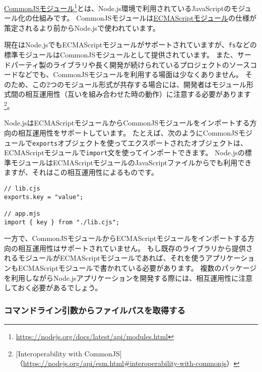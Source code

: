 \begin{tcolorbox}[enhanced jigsaw,breakable,title=CommonJSモジュール]\label{commonjs-module}

\href{https://nodejs.org/docs/latest/api/modules.html}{CommonJSモジュール}\footnote{\url{https://nodejs.org/docs/latest/api/modules.html}}とは、Node.js環境で利用されているJavaScriptのモジュール化の仕組みです。
CommonJSモジュールは\hyperlink{module}{ECMAScriptモジュール}の仕様が策定されるより前からNode.jsで使われています。

現在はNode.jsでもECMAScriptモジュールがサポートされていますが、\texttt{fs}などの標準モジュールはCommonJSモジュールとして提供されています。
また、サードパーティ製のライブラリや長く開発が続けられているプロジェクトのソースコードなどでも、CommonJSモジュールを利用する場面は少なくありません。
そのため、この2つのモジュール形式が共存する場合には、開発者はモジュール形式間の相互運用性（互いを組み合わせた時の動作）に注意する必要があります\footnote{[Interoperability with CommonJS]（\url{https://nodejs.org/api/esm.html\#interoperability-with-commonjs}）}。

Node.jsはECMAScriptモジュールからCommonJSモジュールをインポートする方向の相互運用性をサポートしています。
たとえば、次のようにCommonJSモジュールで\texttt{exports}オブジェクトを使ってエクスポートされたオブジェクトは、ECMAScriptモジュールで\texttt{import}文を使ってインポートできます。
Node.jsの標準モジュールはECMAScriptモジュールのJavaScriptファイルからでも利用できますが、それはこの相互運用性によるものです。

\begin{lstlisting}
// lib.cjs
exports.key = "value";

// app.mjs
import { key } from "./lib.cjs";
\end{lstlisting}

一方で、CommonJSモジュールからECMAScriptモジュールをインポートする方向の相互運用性はサポートされていません。
もし既存のライブラリから提供されるモジュールがECMAScriptモジュールであれば、それを使うアプリケーションもECMAScriptモジュールで書かれている必要があります。
複数のパッケージを利用しながらNode.jsアプリケーションを開発する際には、相互運用性に注意しておく必要があるでしょう。
\end{tcolorbox}

\hypertarget{get-file-path}{%
\subsubsection{コマンドライン引数からファイルパスを取得する}\label{get-file-path}}

